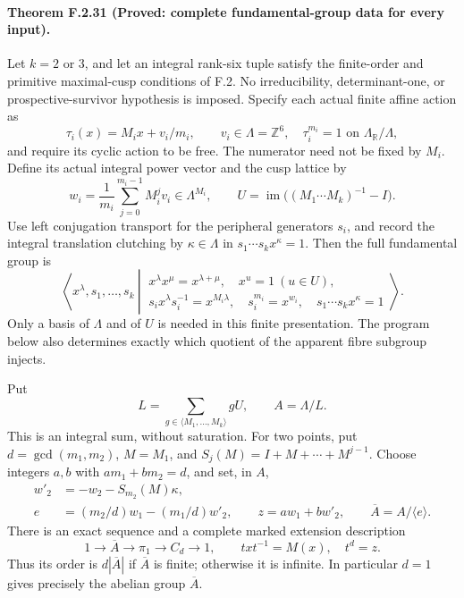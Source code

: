 \paragraph{Theorem F.2.31 (Proved: complete fundamental-group data for every input).}
Let $k=2$ or $3$, and let an integral rank-six tuple satisfy the
finite-order and primitive maximal-cusp conditions of F.2.  No
irreducibility, determinant-one, or prospective-survivor hypothesis is
imposed.  Specify each actual finite affine action as
\[
 \tau_i(x)=M_ix+v_i/m_i,\qquad v_i\in\Lambda=\mathbb Z^6,
 \quad \tau_i^{m_i}=1\text{ on }\Lambda_{\mathbb R}/\Lambda,
 \tag{F.G1}
\]
and require its cyclic action to be free.  The numerator need not be
fixed by $M_i$.  Define its actual integral power vector and the cusp
lattice by
\[
 w_i=\frac1{m_i}\sum_{j=0}^{m_i-1}M_i^jv_i\in\Lambda^{M_i},
 \qquad U=\operatorname{im}\bigl((M_1\cdots M_k)^{-1}-I\bigr).
 \tag{F.G2}
\]
Use left conjugation transport for the peripheral generators $s_i$,
and record the integral translation clutching by $\kappa\in\Lambda$
in $s_1\cdots s_kx^\kappa=1$.  Then the full fundamental group is
\[
 \left\langle x^\lambda,s_1,\ldots,s_k\ \left|\
 \begin{array}{l}
 x^\lambda x^\mu=x^{\lambda+\mu},\quad x^u=1\ (u\in U),\\
 s_ix^\lambda s_i^{-1}=x^{M_i\lambda},\quad
 s_i^{m_i}=x^{w_i},\quad s_1\cdots s_kx^\kappa=1
 \end{array}\right.\right\rangle .                         \tag{F.G3}
\]
Only a basis of $\Lambda$ and of $U$ is needed in this finite
presentation.  The program below also determines exactly which
quotient of the apparent fibre subgroup injects.

Put
\[
 L=\sum_{g\in\langle M_1,\ldots,M_k\rangle}gU,
 \qquad A=\Lambda/L.                                      \tag{F.G4}
\]
This is an integral sum, without saturation.  For two points, put
$d=\gcd(m_1,m_2)$, $M=M_1$, and
$S_j(M)=I+M+\cdots+M^{j-1}$.  Choose integers $a,b$ with
$am_1+bm_2=d$, and set, in $A$,
\[
 \begin{split}
 w'_2&=-w_2-S_{m_2}(M)\kappa,\\
 e&=(m_2/d)w_1-(m_1/d)w'_2,\qquad
 z=aw_1+bw'_2,\qquad \overline A=A/\langle e\rangle .
 \end{split}                                             \tag{F.G5}
\]
There is an exact sequence and a complete marked extension description
\[
 1\longrightarrow\overline A\longrightarrow\pi_1
   \longrightarrow C_d\longrightarrow1,
 \qquad txt^{-1}=M(x),\quad t^d=z.                         \tag{F.G6}
\]
Thus its order is $d|\overline A|$ if $\overline A$ is finite;
otherwise it is infinite.  In particular $d=1$ gives precisely
the abelian group $\overline A$.

